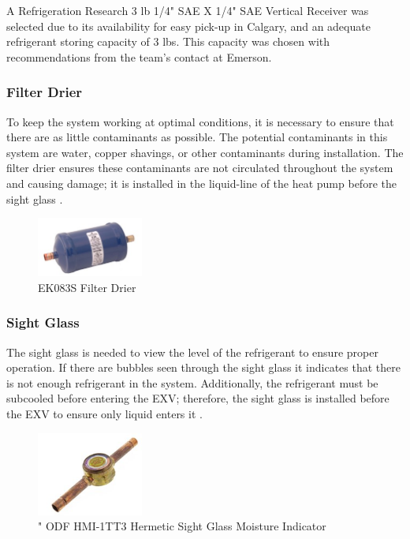 \medskip
A Refrigeration Research 3 lb 1/4" SAE X 1/4" SAE Vertical Receiver \cite{receiver} was selected due to its availability for easy pick-up in Calgary, and an adequate refrigerant storing capacity of 3 lbs. This capacity was chosen with recommendations from the team’s contact at Emerson. 

\subsubsection{Filter Drier}

To keep the system working at optimal conditions, it is necessary to ensure that there are as little contaminants as possible. The potential contaminants in this system are water, copper shavings, or other contaminants during installation. The filter drier ensures these contaminants are not circulated throughout the system and causing damage; it is installed in the liquid-line of the heat pump before the sight glass \cite{sight_glass}.

\medskip
\begin{figure}[H]
    \centering
    \includegraphics[width=3.5cm]{images/filter_drier.jpg}
    \caption{EK083S Filter Drier \cite{filter_drier}}
\end{figure}

\subsubsection{Sight Glass}

The sight glass is needed to view the level of the refrigerant to ensure proper operation. If there are bubbles seen through the sight glass it indicates that there is not enough refrigerant in the system. Additionally, the refrigerant must be subcooled before entering the EXV; therefore, the sight glass is installed before the EXV to ensure only liquid enters it \cite{sight_glass_install}.

\medskip
\begin{figure}[H]
    \centering
    \includegraphics[width=3.5cm]{images/sight_glass.jpg}
    \caption{" ODF HMI-1TT3 Hermetic Sight Glass Moisture Indicator \cite{liquid_sight_glass}}
\end{figure}

